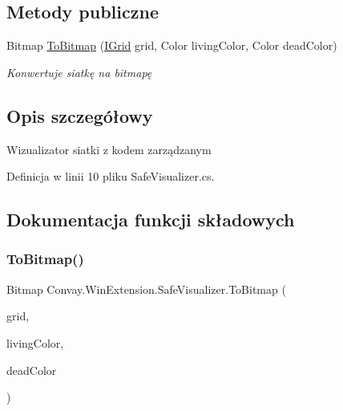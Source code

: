 \subsection*{Metody publiczne}
\begin{DoxyCompactItemize}
\item 
Bitmap \hyperlink{class_convay_1_1_win_extension_1_1_safe_visualizer_a7731cc119c43b9c71c354bdc9053922d}{To\+Bitmap} (\hyperlink{interface_convay_1_1_core_1_1_interfaces_1_1_i_grid}{I\+Grid} grid, Color living\+Color, Color dead\+Color)
\begin{DoxyCompactList}\small\item\em Konwertuje siatkę na bitmapę \end{DoxyCompactList}\end{DoxyCompactItemize}


\subsection{Opis szczegółowy}
Wizualizator siatki z kodem zarządzanym 



Definicja w linii 10 pliku Safe\+Visualizer.\+cs.



\subsection{Dokumentacja funkcji składowych}
\hypertarget{class_convay_1_1_win_extension_1_1_safe_visualizer_a7731cc119c43b9c71c354bdc9053922d}{}\label{class_convay_1_1_win_extension_1_1_safe_visualizer_a7731cc119c43b9c71c354bdc9053922d} 
\subsubsection{\texorpdfstring{To\+Bitmap()}{ToBitmap()}}
{\footnotesize\ttfamily Bitmap Convay.\+Win\+Extension.\+Safe\+Visualizer.\+To\+Bitmap (\begin{DoxyParamCaption}\item[{\hyperlink{interface_convay_1_1_core_1_1_interfaces_1_1_i_grid}{I\+Grid}}]{grid,  }\item[{Color}]{living\+Color,  }\item[{Color}]{dead\+Color }\end{DoxyParamCaption})}



